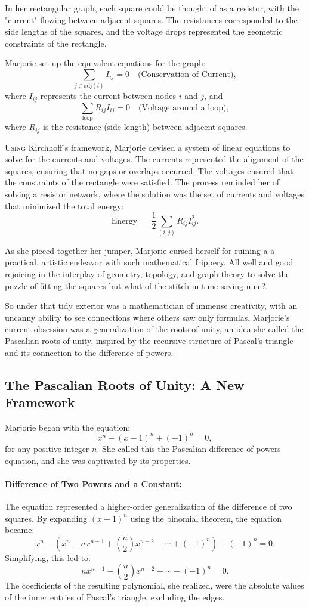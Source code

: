 In her rectangular graph, each square could be thought of as a resistor, with the "current" flowing between adjacent squares. The resistances corresponded to the side lengths of the squares, and the voltage drops represented the geometric constraints of the rectangle.

Marjorie set up the equivalent equations for the graph:
\[
\sum_{j \in \text{adj}(i)} I_{ij} = 0 \quad \text{(Conservation of Current)},
\]
where \(I_{ij}\) represents the current between nodes \(i\) and \(j\), and
\[
\sum_{\text{loop}} R_{ij}I_{ij} = 0 \quad \text{(Voltage around a loop)},
\]
where \(R_{ij}\) is the resistance (side length) between adjacent squares.

\lettrine{U}{sing} Kirchhoff’s framework, Marjorie devised a system of linear equations to solve for the currents and voltages. The currents represented the alignment of the squares, ensuring that no gaps or overlaps occurred. The voltages ensured that the constraints of the rectangle were satisfied. The process reminded her of solving a resistor network, where the solution was the set of currents and voltages that minimized the total energy:
\[
\text{Energy } = \frac{1}{2} \sum_{(i,j)} R_{ij} I_{ij}^2.
\]

As she pieced together her jumper, Marjorie cursed herself for ruining a a practical, artistic endeavor with such mathematical frippery. All well and good rejoicing in the interplay of geometry, topology, and graph theory to solve the puzzle of fitting the squares but what of the stitch in time saving nine?.

So under that tidy exterior was a mathematician of immense creativity, with an uncanny ability to see connections where others saw only formulas. Marjorie’s current obsession was a generalization of the roots of unity, an idea she called the Pascalian roots of unity, inspired by the recursive structure of Pascal’s triangle and its connection to the difference of powers.

\subsection*{The Pascalian Roots of Unity: A New Framework}

Marjorie began with the equation:
\[
x^n - (x-1)^n + (-1)^n = 0,
\]
for any positive integer \(n\). She called this the Pascalian difference of powers equation, and she was captivated by its properties.

\paragraph{Difference of Two Powers and a Constant:} The equation represented a higher-order generalization of the difference of two squares. By expanding \((x-1)^n\) using the binomial theorem, the equation became:
\[
x^n - \left(x^n - n x^{n-1} + \binom{n}{2} x^{n-2} - \cdots + (-1)^n\right) + (-1)^n = 0.
\]
Simplifying, this led to:
\[
n x^{n-1} - \binom{n}{2} x^{n-2} + \cdots + (-1)^n = 0.
\]
The coefficients of the resulting polynomial, she realized, were the absolute values of the inner entries of Pascal’s triangle, excluding the edges.

